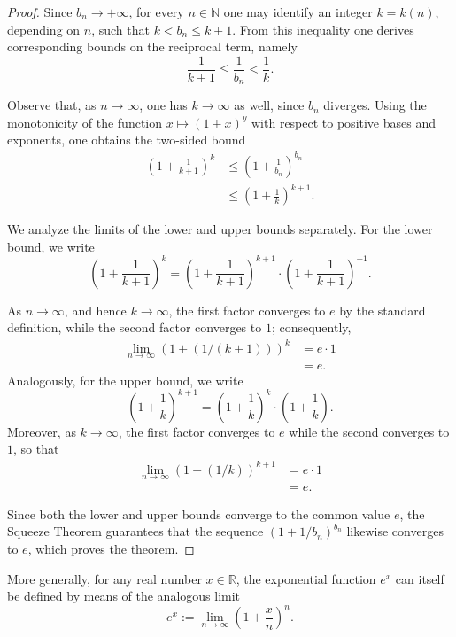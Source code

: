 \begin{proof}
Since $b_n \to +\infty$, for every $n \in \mathbb{N}$ one may identify an integer $k = k(n)$, depending on $n$, such that $k < b_n \leq k+1$. From this inequality one derives corresponding bounds on the reciprocal term, namely
\[
\frac{1}{k+1} \leq \frac{1}{b_n} < \frac{1}{k}.
\]

Observe that, as $n \to \infty$, one has $k \to \infty$ as well, since $b_n$ diverges. Using the monotonicity of the function $x \mapsto (1+x)^y$ with respect to positive bases and exponents, one obtains the two-sided bound
\[
\begin{aligned}
\left( 1 + \frac{1}{k+1} \right)^k &\leq \left( 1 + \frac{1}{b_n} \right)^{b_n} \\
&\leq \left( 1 + \frac{1}{k} \right)^{k+1}.
\end{aligned}
\]

We analyze the limits of the lower and upper bounds separately. For the lower bound, we write
\[
\left( 1 + \frac{1}{k+1} \right)^k = \left( 1 + \frac{1}{k+1} \right)^{k+1} \cdot \left( 1 + \frac{1}{k+1} \right)^{-1}.
\]

As $n \to \infty$, and hence $k \to \infty$, the first factor converges to $e$ by the standard definition, while the second factor converges to $1$; consequently,
\[
\begin{aligned}
\lim_{n \to \infty} (1+(1/(k+1)))^k &= e \cdot 1 \\
&= e.
\end{aligned}
\]
Analogously, for the upper bound, we write
\[
\left( 1 + \frac{1}{k} \right)^{k+1} = \left( 1 + \frac{1}{k} \right)^k \cdot \left( 1 + \frac{1}{k} \right).
\]
Moreover, as $k \to \infty$, the first factor converges to $e$ while the second converges to $1$, so that
\[
\begin{aligned}
\lim_{n \to \infty} (1+(1/k))^{k+1} &= e \cdot 1 \\
&= e.
\end{aligned}
\]

Since both the lower and upper bounds converge to the common value $e$, the Squeeze Theorem guarantees that the sequence $(1+1/b_n)^{b_n}$ likewise converges to $e$, which proves the theorem.
\end{proof}

More generally, for any real number $x \in \mathbb{R}$, the exponential function $e^x$ can itself be defined by means of the analogous limit
\[
e^x := \lim_{n \to \infty} \left( 1 + \frac{x}{n} \right)^n.
\]


